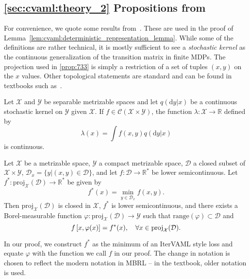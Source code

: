 \subsection{\autoref{sec:cvaml:theory_2} Propositions from \citet{bertsekasshreve1978}}
\label{sec:bertsekas}

For convenience, we quote some results from~\citet{bertsekasshreve1978}.
These are used in the proof of Lemma~\ref{lem:cvaml:deterministic_representation_lemma}.
While some of the definitions are rather technical, it is mostly sufficient to see a \emph{stochastic kernel} as the continuous generalization of the transition matrix in finite MDPs.
The projection used in \autoref{prop:733} is simply a restriction of a set of tuples $(x,y)$ on the $x$ values.
Other topological statements are standard and can be found in textbooks such as~\citet{Munkres2018}.


\begin{proposition}[Proposition~7.30]
\label{prop:730}
    Let $\mathcal{X}$ and $\mathcal{Y}$ be separable metrizable spaces and let $q(\mathrm{d}y|x)$ be a continuous stochastic kernel on $\mathcal{Y}$ given $\mathcal{X}$. If $f\in\mathcal{C}(\mathcal{X}\times \mathcal{Y})$, the function $\lambda: \mathcal{X} \rightarrow \mathbb{R}$ defined by
    \[
        \lambda(x) = \int f(x,y) q(\mathrm{d}y|x)
    \]
    is continuous.
\end{proposition}

\newcommand{\proj}{\text{proj}}
\begin{proposition}[Proposition~7.33]
\label{prop:733}
    Let $\mathcal{X}$ be a metrizable space, $\mathcal{Y}$ a compact metrizable space, $\mathcal{D}$ a closed subset of $\mathcal{X}\times\mathcal{Y}$, $\mathcal{D}_x = \{y | (x,y) \in \mathcal{D} \}$, and let $f:\mathcal{D}\rightarrow \mathbb{R}^*$ be lower semicontinuous.
    Let $f^*:\proj_\mathcal{X}(\mathcal{D}) \rightarrow \mathbb{R}^*$ be given by \[
    f^*(x) = \min_{y \in \mathcal{D}_x} f(x,y).
    \]
    Then $\proj_\mathcal{X}(\mathcal{D})$ is closed in $\mathcal{X}$, $f^*$ is lower semicontinuous, and there exists a Borel-measurable function $\varphi: \proj_\mathcal{X}(\mathcal{D}) \rightarrow \mathcal{Y}$ such that $\text{range}(\varphi) \subset \mathcal{D}$ and \[
    f\squareb{x, \varphi(x)} = f^*(x), \quad \forall x \in \proj_\mathcal{X}(\mathcal{D}).
    \]
\end{proposition}

In our proof, we construct $f^*$ as the minimum of an IterVAML style loss and equate $\varphi$ with the function we call $f$ in our proof.
The change in notation is chosen to reflect the modern notation in MBRL -- in the textbook, older notation is used.
\label{app:conjecture}

